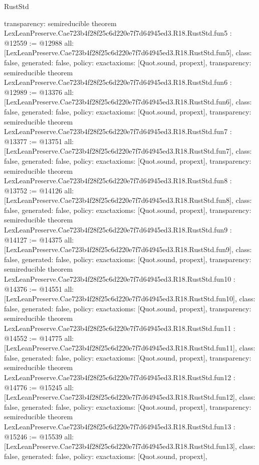 \begin{lexlean}{RustStd}
\begin{coremodule}
{  transparency: semireducible
}
theorem LexLeanPreserve.Cae723b4f28f25c6d220e7f7d64945ed3.R18.RustStd.fun5 : @12559 := @12988 {
  all: [LexLeanPreserve.Cae723b4f28f25c6d220e7f7d64945ed3.R18.RustStd.fun5],
  class: false,
  generated: false,
  policy: exact{axioms: [Quot.sound, propext]},
  transparency: semireducible
}
theorem LexLeanPreserve.Cae723b4f28f25c6d220e7f7d64945ed3.R18.RustStd.fun6 : @12989 := @13376 {
  all: [LexLeanPreserve.Cae723b4f28f25c6d220e7f7d64945ed3.R18.RustStd.fun6],
  class: false,
  generated: false,
  policy: exact{axioms: [Quot.sound, propext]},
  transparency: semireducible
}
theorem LexLeanPreserve.Cae723b4f28f25c6d220e7f7d64945ed3.R18.RustStd.fun7 : @13377 := @13751 {
  all: [LexLeanPreserve.Cae723b4f28f25c6d220e7f7d64945ed3.R18.RustStd.fun7],
  class: false,
  generated: false,
  policy: exact{axioms: [Quot.sound, propext]},
  transparency: semireducible
}
theorem LexLeanPreserve.Cae723b4f28f25c6d220e7f7d64945ed3.R18.RustStd.fun8 : @13752 := @14126 {
  all: [LexLeanPreserve.Cae723b4f28f25c6d220e7f7d64945ed3.R18.RustStd.fun8],
  class: false,
  generated: false,
  policy: exact{axioms: [Quot.sound, propext]},
  transparency: semireducible
}
theorem LexLeanPreserve.Cae723b4f28f25c6d220e7f7d64945ed3.R18.RustStd.fun9 : @14127 := @14375 {
  all: [LexLeanPreserve.Cae723b4f28f25c6d220e7f7d64945ed3.R18.RustStd.fun9],
  class: false,
  generated: false,
  policy: exact{axioms: [Quot.sound, propext]},
  transparency: semireducible
}
theorem LexLeanPreserve.Cae723b4f28f25c6d220e7f7d64945ed3.R18.RustStd.fun10 : @14376 := @14551 {
  all: [LexLeanPreserve.Cae723b4f28f25c6d220e7f7d64945ed3.R18.RustStd.fun10],
  class: false,
  generated: false,
  policy: exact{axioms: [Quot.sound, propext]},
  transparency: semireducible
}
theorem LexLeanPreserve.Cae723b4f28f25c6d220e7f7d64945ed3.R18.RustStd.fun11 : @14552 := @14775 {
  all: [LexLeanPreserve.Cae723b4f28f25c6d220e7f7d64945ed3.R18.RustStd.fun11],
  class: false,
  generated: false,
  policy: exact{axioms: [Quot.sound, propext]},
  transparency: semireducible
}
theorem LexLeanPreserve.Cae723b4f28f25c6d220e7f7d64945ed3.R18.RustStd.fun12 : @14776 := @15245 {
  all: [LexLeanPreserve.Cae723b4f28f25c6d220e7f7d64945ed3.R18.RustStd.fun12],
  class: false,
  generated: false,
  policy: exact{axioms: [Quot.sound, propext]},
  transparency: semireducible
}
theorem LexLeanPreserve.Cae723b4f28f25c6d220e7f7d64945ed3.R18.RustStd.fun13 : @15246 := @15539 {
  all: [LexLeanPreserve.Cae723b4f28f25c6d220e7f7d64945ed3.R18.RustStd.fun13],
  class: false,
  generated: false,
  policy: exact{axioms: [Quot.sound, propext]},
}
\end{coremodule}
\end{lexlean}
